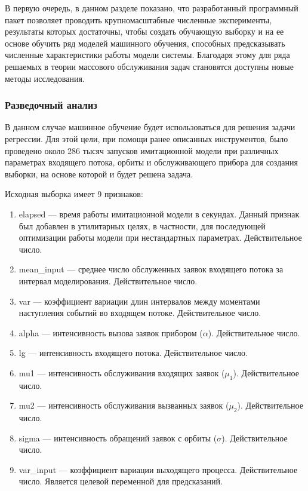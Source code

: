 В первую очередь, в данном разделе показано, что разработанный программный пакет позволяет проводить крупномасштабные численные эксперименты, результаты которых достаточны, чтобы создать обучающую выборку и на ее основе обучить ряд моделей машинного обучения, способных предсказывать численные характеристики работы модели системы. Благодаря этому для ряда решаемых в теории массового обслуживания задач становятся доступны новые методы исследования.

\subsubsection{Разведочный анализ}
В данном случае машинное обучение будет использоваться для решения задачи регрессии. Для этой цели, при помощи ранее описанных инструментов, было проведено около 286 тысяч запусков имитационной модели при различных параметрах входящего потока, орбиты и обслуживающего прибора для создания выборки, на основе которой и будет решена задача.

Исходная выборка имеет 9 признаков:
\begin{enumerate}
	\item elapsed --- время работы имитационной модели в секундах. Данный признак был добавлен в утилитарных целях, в частности, для последующей оптимизации работы модели при нестандартных параметрах. Действительное число.
	\item mean\_input --- среднее число обслуженных заявок входящего потока за интервал моделирования. Действительное число.
	\item var --- коэффициент вариации длин интервалов между моментами наступления событий во входящем потоке. Действительное число.
	\item alpha --- интенсивность вызова заявок прибором ($\alpha$). Действительное число.
	\item lg --- интенсивность входящего потока. Действительное число.
	\item mu1 --- интенсивность обслуживания входящих заявок ($\mu_1$). Действительное число.
	\item mu2 --- интенсивность обслуживания вызванных заявок ($\mu_2$). Действительное число.
	\item sigma --- интенсивность обращений заявок с орбиты ($\sigma$). Действительное число.
	\item var\_input --- коэффициент вариации выходящего процесса. Действительное число. Является целевой переменной для предсказаний.
\end{enumerate}

